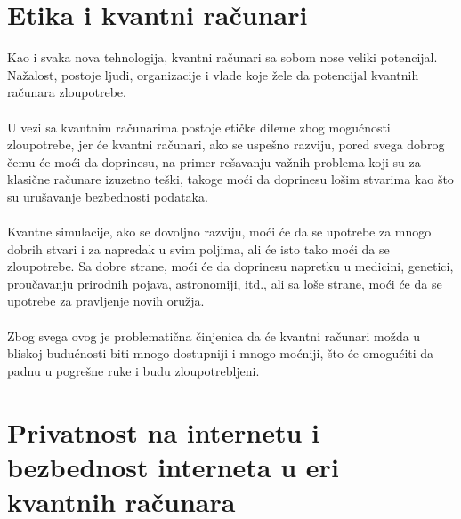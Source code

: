 \documentclass[fleqn, 12pt]{article}
\begin{document}
\newpage

\section{Etika i kvantni računari}

\begin{text}
Kao i svaka nova tehnologija, kvantni računari sa sobom nose veliki potencijal. Nažalost, postoje ljudi, organizacije i vlade koje žele da potencijal kvantnih računara zloupotrebe.
\\\\

U vezi sa kvantnim računarima postoje etičke dileme zbog mogućnosti zloupotrebe, jer će kvantni računari, ako se uspešno razviju, pored svega dobrog čemu će moći da doprinesu, na primer rešavanju važnih problema koji su za klasične računare izuzetno teški, takoge moći da doprinesu lošim stvarima kao što su urušavanje bezbednosti podataka.
\\\\

Kvantne simulacije, ako se dovoljno razviju, moći će da se upotrebe za mnogo dobrih stvari i za napredak u svim poljima, ali će isto tako moći da se zloupotrebe. Sa dobre strane, moći će da doprinesu napretku u medicini, genetici, proučavanju prirodnih pojava, astronomiji, itd., ali sa loše strane, moći će da se upotrebe za pravljenje novih oružja.
\\\\

Zbog svega ovog je problematična činjenica da će kvantni računari možda u bliskoj budućnosti biti mnogo dostupniji i mnogo moćniji, što će omogućiti da padnu u pogrešne ruke i budu zloupotrebljeni.
\end{text}

\newpage

\section{Privatnost na internetu i bezbednost interneta u eri kvantnih računara}
\end{document}
